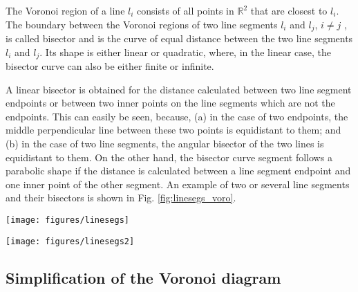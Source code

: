 The Voronoi region of a line $l_i$ consists of all points in $\mathbb{R}^2$ that are closest to $l_i$. 
The boundary between the Voronoi regions of two line segments $l_i$ and $l_j$, $i \neq j$ , 
is called bisector and is the curve of equal distance between the two line segments $l_i$ and $l_j$.
Its shape is either linear or quadratic, where, in the linear case, the bisector curve can also be either finite or infinite.

A linear bisector is obtained for the distance calculated between two line segment endpoints or between two inner 
points on the line segments which are not the endpoints.
This can easily be seen, because, (a) in the case of two endpoints, the middle perpendicular line between these 
two points is equidistant to them; and (b) in the case of two line segments, the angular bisector of the two lines is
equidistant to them.
On the other hand, the bisector curve segment follows a parabolic shape if the distance is calculated 
between a line segment endpoint and one inner point of the other segment.
An example of two or several line segments and their bisectors is shown in Fig. \ref{fig:linesegs_voro}.

\label{sec:voronoi}
\begin{figure*}
	\begin{minipage}{1 \textwidth}
		\begin{center}
			\texttt{[image: figures/linesegs]}
		\end{center}
	\end{minipage}
	\vspace{1cm}
	\begin{minipage}{1 \textwidth}
		\begin{center}
			\texttt{[image: figures/linesegs2]}
		\end{center}
	\end{minipage}
	\caption{Top panel: Voronoi regions for two line segments, $l_1$ and $l_2$.
	Bottom panel: Voronoi regions for five line segments, $l_1,\, l_2,\, ...,\, l_5$.
	The line segments and their endpoints are marked in blue. The small red points represent the Voronoi vertices.
	The black lines are the bisectors of the Voronoi regions, where the solid lines delimit finite and the dashed lines
	infinite regions. Helper lines are marked in red.
	\label{fig:linesegs_voro}}
\end{figure*}



\subsection{Simplification of the Voronoi diagram}


